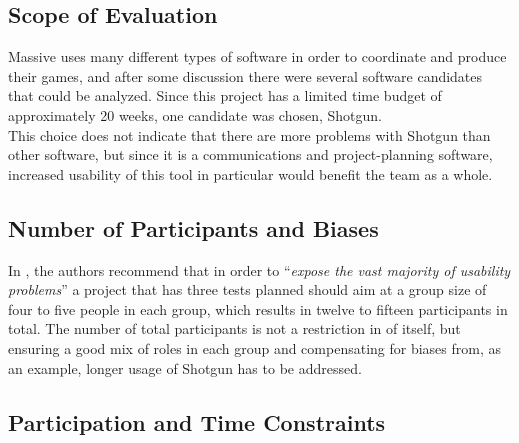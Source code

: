 \documentclass{article}
\newcommand{\myenquote}[1]{\enquote{\itshape#1}}
\begin{document}
  \subsection{Scope of Evaluation}

    Massive uses many different types of software in order to coordinate and
    produce their games, and after some discussion there were several software
    candidates that could be analyzed. Since this project has a limited time
    budget of approximately 20 weeks, one candidate was chosen, Shotgun. \\

    This choice does not indicate that there are more problems with Shotgun
    than other software, but since it is a communications and project-planning
    software, increased usability of this tool in particular would benefit the
    team as a whole.


  \subsection{Number of Participants and Biases}

    In \cite[p.126]{c_handbook_usability}, the
    authors recommend that in order to \myenquote{expose the vast majority of
      usability problems} a project that has three tests planned should aim at
    a group size of four to five people in each group, which results in twelve
    to fifteen participants in total. The number of total participants is not a
    restriction in of itself, but ensuring a good mix of roles in each group
    and compensating for biases from, as an example, longer usage of Shotgun
    has to be addressed.


  \subsection{Participation and Time Constraints}
\end{document}
